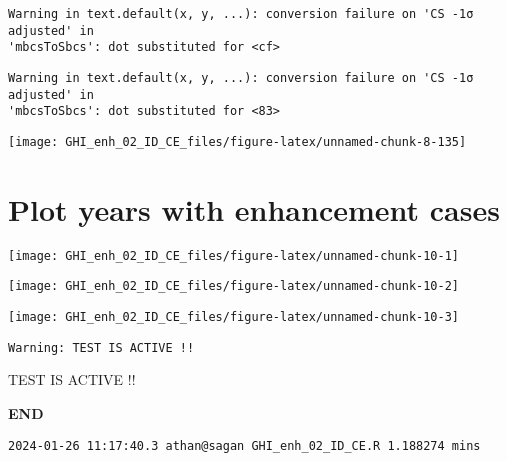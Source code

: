 \documentclass[
  10pt,
  a4paper,oneside]{article}
\begin{document}
\begin{verbatim}
Warning in text.default(x, y, ...): conversion failure on 'CS -1σ adjusted' in
'mbcsToSbcs': dot substituted for <cf>
\end{verbatim}

\begin{verbatim}
Warning in text.default(x, y, ...): conversion failure on 'CS -1σ adjusted' in
'mbcsToSbcs': dot substituted for <83>
\end{verbatim}

\begin{center}\texttt{[image: GHI\_enh\_02\_ID\_CE\_files/figure-latex/unnamed-chunk-8-135]} \end{center}

\newpage
\FloatBarrier

\hypertarget{plot-years-with-enhancement-cases}{%
\section{Plot years with enhancement cases}\label{plot-years-with-enhancement-cases}}

\begin{center}\texttt{[image: GHI\_enh\_02\_ID\_CE\_files/figure-latex/unnamed-chunk-10-1]} \end{center}

\begin{center}\texttt{[image: GHI\_enh\_02\_ID\_CE\_files/figure-latex/unnamed-chunk-10-2]} \end{center}

\begin{center}\texttt{[image: GHI\_enh\_02\_ID\_CE\_files/figure-latex/unnamed-chunk-10-3]} \end{center}

\begin{verbatim}
Warning: TEST IS ACTIVE !!
\end{verbatim}

TEST IS ACTIVE !!

\textbf{END}

\begin{verbatim}
2024-01-26 11:17:40.3 athan@sagan GHI_enh_02_ID_CE.R 1.188274 mins
\end{verbatim}
\end{document}
